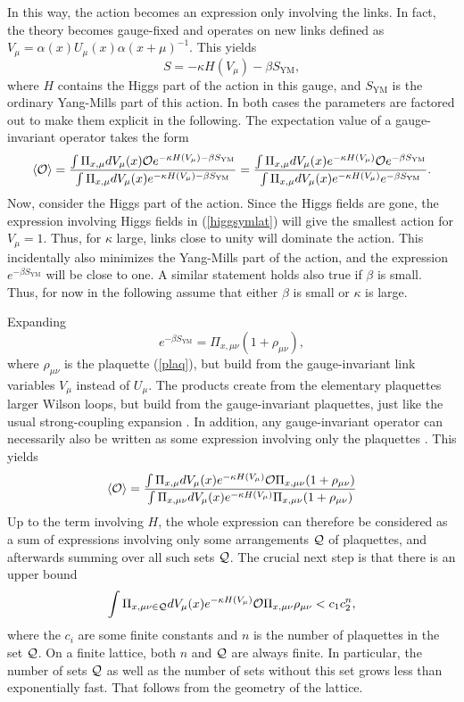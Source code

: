 \documentclass[final,twoside,12pt]{article}
\newcommand*{\no}{\noindent}
\newcommand*{\be}{\begin{equation}}
\newcommand*{\ee}{\end{equation}}
\newcommand*{\pref}[1]{(\ref{#1})}
\newcommand*{\mn}{{\mu\nu}}
\newcommand*{\nn}{\nonumber}
\newcommand*{\1}{1\!\!\!\bot}
\newcommand*{\la}{\left\langle}
\newcommand*{\ra}{\right\rangle}
\newcommand*{\op}{{\cal O}}
\newcommand*{\ym}{{\text{YM}}}
\begin{document}
In this way, the action becomes an expression only involving the links. In fact, the theory becomes gauge-fixed and operates on new links defined as $V_\mu=\alpha(x) U_\mu(x)\alpha(x+\mu)^{-1}$. This yields
\be
S=-\kappa H(V_\mu)-\beta S_\ym\nn,
\ee
\no where $H$ contains the Higgs part of the action in this gauge, and $S_\text{YM}$ is the ordinary Yang-Mills part of this action. In both cases the parameters are factored out to make them explicit in the following. The expectation value of a gauge-invariant operator takes the form
\be
\la\op\ra=\frac{\int\Pi_{x,\mu}dV_\mu(x)\op e^{-\kappa H(V_\mu)-\beta S_\ym}}{\int\Pi_{x,\mu}dV_\mu(x) e^{-\kappa H(V_\mu)-\beta S_\ym}}=\frac{\int\Pi_{x,\mu}dV_\mu(x)e^{-\kappa H(V_\mu)}\op e^{-\beta S_\ym}}{\int\Pi_{x,\mu}dV_\mu(x) e^{-\kappa H(V_\mu)}e^{-\beta S_\ym}}\nn.
\ee
\no Now, consider the Higgs part of the action. Since the Higgs fields are gone, the expression involving Higgs fields in \pref{higgsymlat} will give the smallest action for $V_\mu=1$. Thus, for $\kappa$ large, links close to unity will dominate the action. This incidentally also minimizes the Yang-Mills part of the action, and the expression $e^{-\beta S_\ym}$ will be close to one. A similar statement holds also true if $\beta$ is small. Thus, for now in the following assume that either $\beta$ is small or $\kappa$ is large.

Expanding
\be
e^{-\beta S_\ym}=\Pi_{x,\mn}(1+\rho_\mn)\nn,
\ee
\no where $\rho_\mn$ is the plaquette \pref{plaq}, but build from the gauge-invariant link variables $V_\mu$ instead of $U_\mu$. The products create from the elementary plaquettes larger Wilson loops, but build from the gauge-invariant plaquettes, just like the usual strong-coupling expansion \cite{Montvay:1994cy}. In addition, any gauge-invariant operator can necessarily also be written as some expression involving only the plaquettes \cite{Montvay:1994cy}. This yields \cite{Osterwalder:1977pc}
\be
\la\op\ra=\frac{\int\Pi_{x,\mu}dV_\mu(x)e^{-\kappa H(V_\mu)}\op \Pi_{x,\mn}(1+\rho_\mn)}{\int\Pi_{x,\mn}dV_\mu(x) e^{-\kappa H(V_\mu)}\Pi_{x,\mn}(1+\rho_\mn)}\nn
\ee
\no Up to the term involving $H$, the whole expression can therefore be considered as a sum of expressions involving only some arrangements ${\cal Q}$ of plaquettes, and afterwards summing over all such sets ${\cal Q}$. The crucial next step is that there is an upper bound \cite{Osterwalder:1977pc}
\be
\int\Pi_{{x,\mn}\in{\cal Q}}dV_\mu(x)e^{-\kappa H(V_\mu)}\op \Pi_{x,\mn}\rho_\mn< c_1c_2^n\nn,
\ee
\no where the $c_i$ are some finite constants and $n$ is the number of plaquettes in the set ${\cal Q}$. On a finite lattice, both $n$ and ${\cal Q}$ are always finite. In particular, the number of sets ${\cal Q}$ as well as the number of sets without this set grows less than exponentially fast. That follows from the geometry of the lattice.
\end{document}
